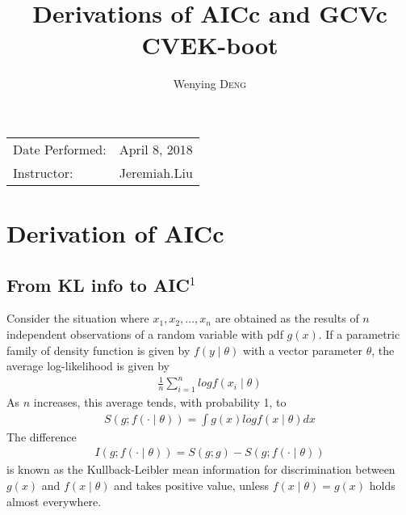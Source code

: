 \documentclass{article}
\title{Derivations of  AICc and GCVc\\ CVEK-boot} %
\author{Wenying \textsc{Deng}} %
\begin{document}
\maketitle %

\begin{center}
\begin{tabular}{l r}
Date Performed: & April 8, 2018 \\ %
Instructor: & Jeremiah.Liu %
\end{tabular}
\end{center}



\section{Derivation of AICc}
\subsection{From KL info to AIC$^{1}$}
Consider the situation where $x_1, x_2,..., x_n$ are obtained as the results of $n$ independent observations of a random variable with pdf $g(x)$. If a parametric family of density function is given by $f(y\mid \theta)$ with a vector parameter $\theta$, the average log-likelihood is given by
\begin{align*}
\frac{1}{n}\sum_{i=1}^n log f(x_i \mid \theta)
\end{align*}
As $n$ increases, this average tends, with probability 1, to
\begin{align*}
S(g;f(\cdot \mid \theta))=\int g(x)log f(x\mid \theta)dx
\end{align*}
The difference
\begin{align}
I(g;f(\cdot \mid \theta))=S(g;g)-S(g;f(\cdot \mid \theta))
\end{align}
is known as the Kullback-Leibler mean information for discrimination between $g(x)$ and $f(x\mid \theta)$ and takes positive value, unless $f(x\mid \theta)=g(x)$ holds almost everywhere.\\
\end{document}

